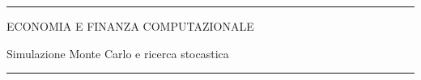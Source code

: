 \documentclass[12pt,aspectratio=169]{beamer}
\begin{document}
\begin{frame}
\unitlength 5mm

\begin{center}

\rule{\textwidth}{2pt}

\vskip3mm
ECONOMIA E FINANZA COMPUTAZIONALE

Simulazione Monte Carlo e ricerca stocastica
\rule{\textwidth}{2pt}

\end{center}

\end{frame}


\end{document}
